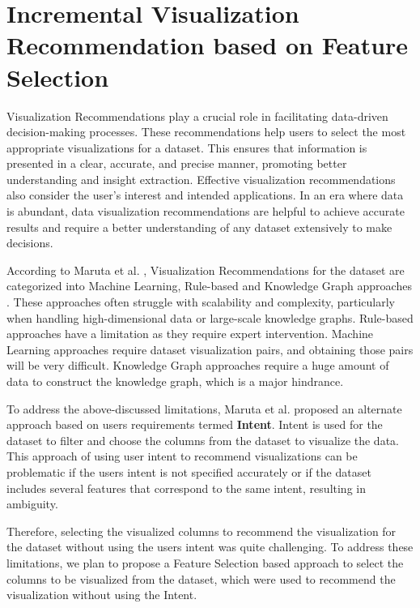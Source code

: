 \chapter{Incremental Visualization Recommendation based on Feature Selection}

Visualization Recommendations play a crucial role in facilitating data-driven decision-making processes. These recommendations help users to select the most appropriate visualizations for a dataset. This ensures that information is presented in a clear, accurate, and precise manner, promoting better understanding and insight extraction. Effective visualization recommendations also consider the user's interest and intended applications. In an era where data is abundant, data visualization recommendations are helpful to achieve accurate results and require a better understanding of any dataset extensively to make decisions. 

According to Maruta et al. \cite{maruta2021intent}, Visualization Recommendations for the dataset are categorized into Machine Learning, Rule-based and Knowledge Graph approaches \cite{li2021kg4vis}. These approaches often struggle with scalability and complexity, particularly when handling high-dimensional data or large-scale knowledge graphs. Rule-based approaches \cite{mackinlay1986automating, mackinlay2007show, roth1994interactive, wongsuphasawat2017voyager, stolte2002polaris} have a limitation as they require expert intervention. Machine Learning approaches \cite{qian2020ml, hu2019vizml, dibia2019data2vis, luo2018deepeye, moritz2018formalizing} require dataset visualization pairs, and obtaining those pairs will be very difficult. Knowledge Graph approaches require a huge amount of data to construct the knowledge graph, which is a major hindrance. 

To address the above-discussed limitations, Maruta et al. \cite{maruta2021intent} proposed an alternate approach based on users requirements termed \textbf{Intent}. Intent is used for the dataset to filter and choose the columns from the dataset to visualize the data. This approach of using user intent to recommend visualizations can be problematic if the users intent is not specified accurately or if the dataset includes several features that correspond to the same intent, resulting in ambiguity.
   
Therefore, selecting the visualized columns to recommend the visualization for the dataset without using the users intent was quite challenging. To address these limitations, we plan to propose a Feature Selection based approach to select the columns to be visualized from the dataset, which were used to recommend the visualization without using the Intent.


